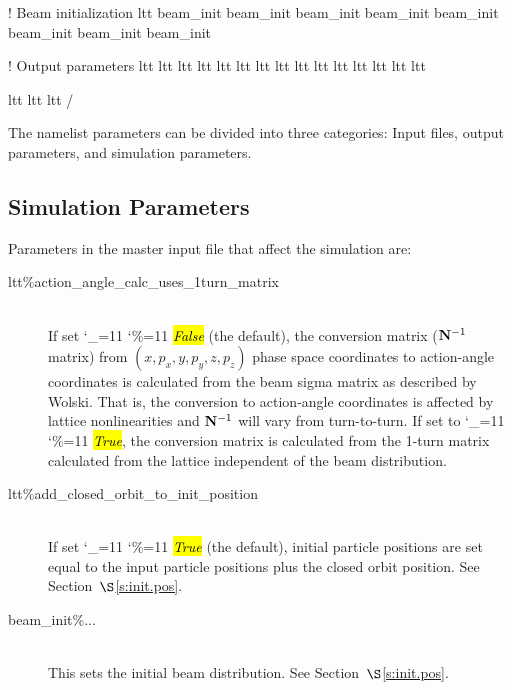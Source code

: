 \documentclass{hitec}
\newcommand\dottcmd[1]{\hl{\em#1}\endgroup}
\newcommand{\vn}{\begingroup\catcode`\_=11 \catcode`\%=11 \dottcmd}
\newcommand{\Newline}{\hfil \\}
\newcommand{\sref}[1]{$\S$\ref{#1}}
\newcommand{\Bf}[1]{{\bf #1}}
\newcommand{\bfN}{\Bf N}
\begin{document}
{{{{{{{{{{{{\begin{code}
{{{{{{{{{{{\begin{code}
  ! Beam initialization
  ltt%
  beam_init%
  beam_init%
  beam_init%
  beam_init%
  beam_init%
  beam_init%
  beam_init%
  beam_init%

  ! Output parameters
  ltt%
  ltt%
  ltt%
  ltt%
  ltt%
  ltt%
  ltt%
  ltt%
  ltt%
  ltt%
  ltt%
  ltt%
  ltt%
  ltt%
  ltt%

  ltt%
  ltt%
  ltt%
/
\end{code}

The namelist parameters can be divided into three categories: Input files, output parameters, and
simulation parameters.

\subsection{Simulation Parameters}
\label{s:sim.params}

Parameters in the master input file that affect the simulation are:
\begin{description}

\item[ltt\%action_angle_calc_uses_1turn_matrix] \Newline
If set \vn{False} (the default), the conversion matrix ($\bfN^{-1}$ matrix) from $(x, p_x, y, p_y,
z, p_z)$ phase space coordinates to action-angle coordinates is calculated from the beam sigma
matrix as described by Wolski\cite{b:wolski}. That is, the conversion to action-angle coordinates is
affected by lattice nonlinearities and $\bfN^{-1}$ will vary from turn-to-turn. If set to \vn{True},
the conversion matrix is calculated from the 1-turn matrix calculated from the lattice independent of
the beam distribution.
%
\item[ltt\%add_closed_orbit_to_init_position] \Newline
If set \vn{True} (the default), initial particle positions are set equal to the input particle positions
plus the closed orbit position. See Section~\sref{s:init.pos}.
%
\item[beam_init\%...] \Newline
This sets the initial beam distribution. See Section~\sref{s:init.pos}. 


\end{description}}}}}}}}}}}}
\end{code}}}}}}}}}}}}}
\end{document}
